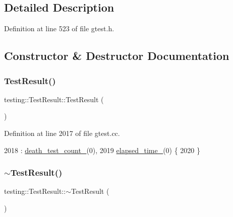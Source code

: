 \subsection{Detailed Description}


Definition at line 523 of file gtest.\+h.



\subsection{Constructor \& Destructor Documentation}
\mbox{\label{classtesting_1_1TestResult_a5cf5dd6f416b7334ea601aab21a2fda5}} 
\subsubsection{\texorpdfstring{Test\+Result()}{TestResult()}}
{\footnotesize\ttfamily testing\+::\+Test\+Result\+::\+Test\+Result (\begin{DoxyParamCaption}{ }\end{DoxyParamCaption})}



Definition at line 2017 of file gtest.\+cc.


\begin{DoxyCode}
2018     : \hyperlink{classtesting_1_1TestResult_a3810b34e68f5dca9ad1237a5bde7fa21}{death\_test\_count\_}(0),
2019       \hyperlink{classtesting_1_1TestResult_a739a8ca54db4be004ba748b11e82b056}{elapsed\_time\_}(0) \{
2020 \}
\end{DoxyCode}
\mbox{\label{classtesting_1_1TestResult_a41f407680b725b75d7eadc3230bc3315}} 
\subsubsection{\texorpdfstring{$\sim$\+Test\+Result()}{~TestResult()}}
{\footnotesize\ttfamily testing\+::\+Test\+Result\+::$\sim$\+Test\+Result (\begin{DoxyParamCaption}{ }\end{DoxyParamCaption})}



